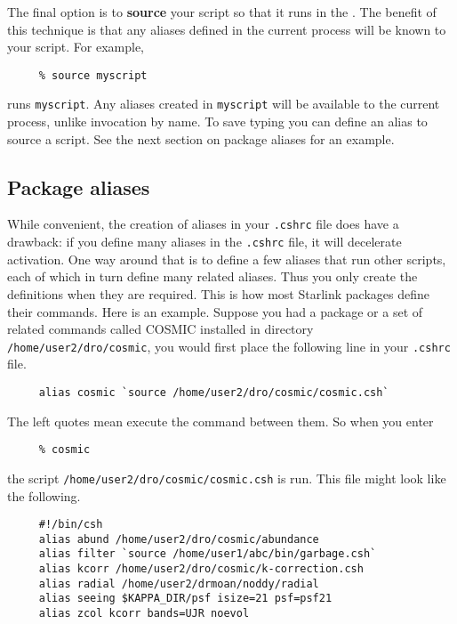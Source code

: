 The final option is to {\bf source} your script so that it runs in the
.  The benefit of this technique is
that any aliases defined in the current process will be known to your
script.  For example,

\small
\begin{verbatim}
     % source myscript
\end{verbatim}
\normalsize
runs {\tt myscript}.  Any aliases created in {\tt myscript} will be
available to the current process, unlike invocation by name.
To save typing you can define an alias to source a script.  See the next
section on package aliases for an example.

\subsection{Package aliases\label{sc4_se_package}}

While convenient, the creation of aliases in your {\tt .cshrc} file
does have a drawback: if you define many aliases in the {\tt .cshrc}
file, it will decelerate  activation.
One way around that is to define a few aliases that run other scripts,
each of which in turn define many related aliases.  Thus you only
create the definitions when they are required.  This is how most
Starlink packages define their commands.  Here is an example.  Suppose
you had a package or a set of related commands called COSMIC installed
in directory {\tt /home/user2/dro/cosmic}, you would first place the
following line in your {\tt .cshrc} file.

\small
\begin{verbatim}
     alias cosmic `source /home/user2/dro/cosmic/cosmic.csh`
\end{verbatim}
\normalsize
The left quotes mean execute the command between them.  So when you
enter

\small
\begin{verbatim}
     % cosmic
\end{verbatim}
\normalsize
the script {\tt /home/user2/dro/cosmic/cosmic.csh} is run.  This file
might look like the following.

\small
\begin{verbatim}
     #!/bin/csh
     alias abund /home/user2/dro/cosmic/abundance
     alias filter `source /home/user1/abc/bin/garbage.csh`
     alias kcorr /home/user2/dro/cosmic/k-correction.csh
     alias radial /home/user2/drmoan/noddy/radial
     alias seeing $KAPPA_DIR/psf isize=21 psf=psf21
     alias zcol kcorr bands=UJR noevol
\end{verbatim}
\normalsize

